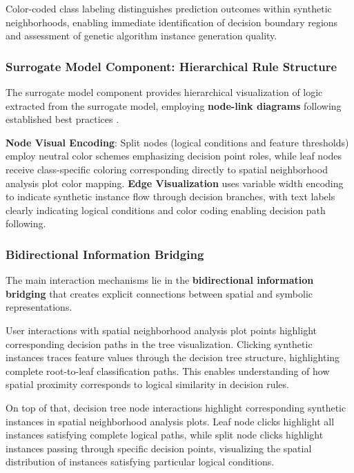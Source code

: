 Color-coded class labeling distinguishes prediction outcomes within synthetic neighborhoods, enabling immediate identification of decision boundary regions and assessment of genetic algorithm instance generation quality.

\subsubsection{Surrogate Model Component: Hierarchical Rule Structure}

The surrogate model component provides hierarchical visualization of logic extracted from 
the
surrogate model, employing \textbf{node-link diagrams} following established best practices \cite{Streeb2021TaskBasedVI}.

\textbf{Node Visual Encoding}: Split nodes (logical conditions and feature thresholds) employ neutral color schemes emphasizing decision point roles, while leaf nodes receive class-specific coloring corresponding directly to spatial neighborhood analysis plot color mapping. \textbf{Edge Visualization} uses variable width encoding to indicate synthetic instance flow through decision branches, with text labels clearly indicating logical conditions and color coding enabling decision path following.

\subsubsection{Bidirectional Information Bridging}

The main interaction mechanisms lie in the \textbf{bidirectional information bridging} that creates explicit connections between spatial and symbolic representations.

User interactions with spatial neighborhood analysis plot points highlight corresponding decision paths in the tree visualization. Clicking synthetic instances traces feature values through the decision tree structure, highlighting complete root-to-leaf classification paths. This enables understanding of how spatial proximity corresponds to logical similarity in decision rules.

On top of that, 
decision tree node interactions highlight corresponding synthetic instances in spatial neighborhood analysis plots. Leaf node clicks highlight all instances satisfying complete logical paths, while split node clicks highlight instances passing through specific decision points, visualizing the spatial distribution of instances satisfying particular logical conditions.


